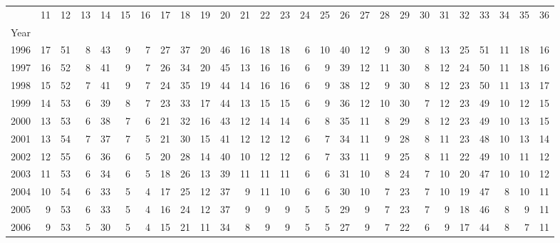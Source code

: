 \begin{tabular}{lrrrrrrrrrrrrrrrrrrrrrrrrrr}
\toprule
{} &  11 &  12 &  13 &  14 &  15 &  16 &  17 &  18 &  19 &  20 &  21 &  22 &  23 &  24 &  25 &  26 &  27 &  28 &  29 &  30 &  31 &  32 &  33 &  34 &  35 &  36 \\
Year &     &     &     &     &     &     &     &     &     &     &     &     &     &     &     &     &     &     &     &     &     &     &     &     &     &     \\
\midrule
1996 &  17 &  51 &   8 &  43 &   9 &   7 &  27 &  37 &  20 &  46 &  16 &  18 &  18 &   6 &  10 &  40 &  12 &   9 &  30 &   8 &  13 &  25 &  51 &  11 &  18 &  16 \\
1997 &  16 &  52 &   8 &  41 &   9 &   7 &  26 &  34 &  20 &  45 &  13 &  16 &  16 &   6 &   9 &  39 &  12 &  11 &  30 &   8 &  12 &  24 &  50 &  11 &  18 &  16 \\
1998 &  15 &  52 &   7 &  41 &   9 &   7 &  24 &  35 &  19 &  44 &  14 &  16 &  16 &   6 &   9 &  38 &  12 &   9 &  30 &   8 &  12 &  23 &  50 &  11 &  13 &  17 \\
1999 &  14 &  53 &   6 &  39 &   8 &   7 &  23 &  33 &  17 &  44 &  13 &  15 &  15 &   6 &   9 &  36 &  12 &  10 &  30 &   7 &  12 &  23 &  49 &  10 &  12 &  15 \\
2000 &  13 &  53 &   6 &  38 &   7 &   6 &  21 &  32 &  16 &  43 &  12 &  14 &  14 &   6 &   8 &  35 &  11 &   8 &  29 &   8 &  12 &  23 &  49 &  10 &  13 &  15 \\
2001 &  13 &  54 &   7 &  37 &   7 &   5 &  21 &  30 &  15 &  41 &  12 &  12 &  12 &   6 &   7 &  34 &  11 &   9 &  28 &   8 &  11 &  23 &  48 &  10 &  13 &  14 \\
2002 &  12 &  55 &   6 &  36 &   6 &   5 &  20 &  28 &  14 &  40 &  10 &  12 &  12 &   6 &   7 &  33 &  11 &   9 &  25 &   8 &  11 &  22 &  49 &  10 &  11 &  12 \\
2003 &  11 &  53 &   6 &  34 &   6 &   5 &  18 &  26 &  13 &  39 &  11 &  11 &  11 &   6 &   6 &  31 &  10 &   8 &  24 &   7 &  10 &  20 &  47 &  10 &  10 &  12 \\
2004 &  10 &  54 &   6 &  33 &   5 &   4 &  17 &  25 &  12 &  37 &   9 &  11 &  10 &   6 &   6 &  30 &  10 &   7 &  23 &   7 &  10 &  19 &  47 &   8 &  10 &  11 \\
2005 &   9 &  53 &   6 &  33 &   5 &   4 &  16 &  24 &  12 &  37 &   9 &   9 &   9 &   5 &   5 &  29 &   9 &   7 &  23 &   7 &   9 &  18 &  46 &   8 &   9 &  11 \\
2006 &   9 &  53 &   5 &  30 &   5 &   4 &  15 &  21 &  11 &  34 &   8 &   9 &   9 &   5 &   5 &  27 &   9 &   7 &  22 &   6 &   9 &  17 &  44 &   8 &   7 &  11 \\

\end{tabular}
